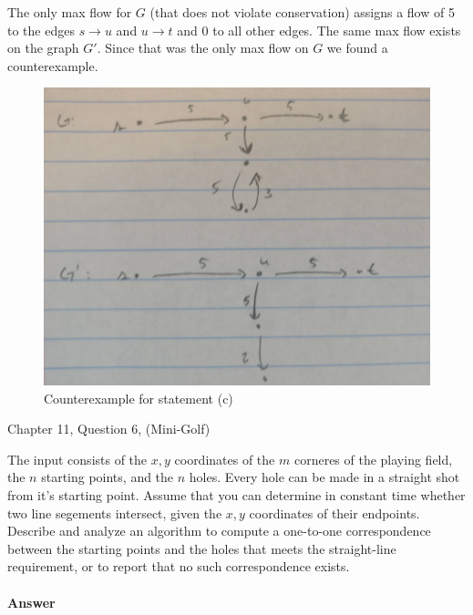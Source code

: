\documentclass{article}
\begin{document}
\begin{enumerate}[label=(\alph*)]
    The only max flow for $G$ (that does not violate conservation) assigns a flow of 5 to the edges $s \to u$ and $u \to t$ and 0 to all other edges.
    The same max flow exists on the graph $G'$. Since that was the only max flow on $G$ we found a counterexample.
        \begin{figure}[h]
        \begin{center}
            \includegraphics[scale=0.25]{img/7-4-c}
            \caption{Counterexample for statement (c)}
            \label{fig:7-4-c}
        \end{center}
        \end{figure}
\end{enumerate}


\nextprob
{}

Chapter 11, Question 6, (Mini-Golf)

The input consists of the $x,y$ coordinates of the $m$ corneres of the playing field, the $n$ starting points, and the $n$ holes.
Every hole can be made in a straight shot from it's starting point.
Assume that you can determine in constant time whether two line segements intersect, given the $x,y$ coordinates of their endpoints.
Describe and analyze an algorithm to compute a one-to-one correspondence between the starting points and the holes that meets the straight-line requirement, or to report that no such correspondence exists.

\paragraph{Answer}
\end{document}
